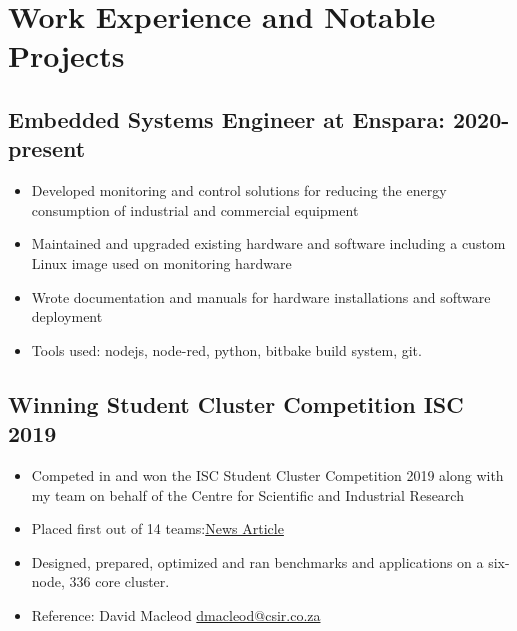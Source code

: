 \documentclass[12pt,a4paper,notitlepage]{article}
\begin{document}
\section*{Work Experience and Notable Projects}

\subsection*{Embedded Systems Engineer at Enspara: 2020-present}
\begin{itemize}
	\setlength\itemsep{0.02em}
    \item Developed monitoring and control solutions for reducing the energy consumption of industrial and commercial equipment
    \item Maintained and upgraded existing hardware and software including a custom Linux image used on monitoring hardware
    \item Wrote documentation and manuals for hardware installations and software deployment
    \item Tools used: nodejs, node-red, python, bitbake build system, git.
\end{itemize}

\subsection*{Winning Student Cluster Competition ISC 2019}
\begin{itemize}
	\setlength\itemsep{0.02em}
    \item Competed in and won the ISC Student Cluster Competition 2019 along with my team on behalf of the Centre for Scientific and Industrial Research
    \item Placed first out of 14 teams:\href{https://www.chpc.ac.za/index.php/news2/241-south-africa-wins-international-student-cluster-competition-for-the-fourth-time}{News Article}
    \item Designed, prepared, optimized and ran benchmarks and applications on a six-node, 336 core cluster.
    \item Reference: David Macleod \href{mailto:dmacleod@csir.co.za}{dmacleod@csir.co.za}
\end{itemize}
\end{document}
